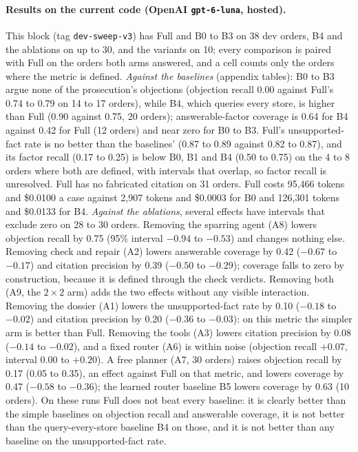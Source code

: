 \paragraph{Results on the current code (OpenAI \texttt{gpt-6-luna}, hosted).}    This block (tag \texttt{dev-sweep-v3}) has Full and B0 to B3 on 38 dev orders, B4 and the ablations on up to 30, and the variants on 10; every comparison is paired with Full on the orders both arms answered, and a cell counts only the orders where the metric is defined. \emph{Against the baselines} (appendix tables): B0 to B3 argue none of the prosecution's objections (objection recall 0.00 against Full's 0.74 to 0.79 on 14 to 17 orders), while B4, which queries every store, is higher than Full (0.90 against 0.75, 20 orders); answerable-factor coverage is 0.64 for B4 against 0.42 for Full (12 orders) and near zero for B0 to B3. Full's unsupported-fact rate is no better than the baselines' (0.87 to 0.89 against 0.82 to 0.87), and its factor recall (0.17 to 0.25) is below B0, B1 and B4 (0.50 to 0.75) on the 4 to 8 orders where both are defined, with intervals that overlap, so factor recall is unresolved. Full has no fabricated citation on 31 orders. Full costs 95,466 tokens and \$0.0100 a case against 2,907 tokens and \$0.0003 for B0 and 126,301 tokens and \$0.0133 for B4. \emph{Against the ablations}, several effects have intervals that exclude zero on 28 to 30 orders. Removing the sparring agent (A8) lowers objection recall by 0.75 (95\% interval $-0.94$ to $-0.53$) and changes nothing else. Removing check and repair (A2) lowers answerable coverage by 0.42 ($-0.67$ to $-0.17$) and citation precision by 0.39 ($-0.50$ to $-0.29$); coverage falls to zero by construction, because it is defined through the check verdicts. Removing both (A9, the $2\times2$ arm) adds the two effects without any visible interaction. Removing the dossier (A1) lowers the unsupported-fact rate by 0.10 ($-0.18$ to $-0.02$) and citation precision by 0.20 ($-0.36$ to $-0.03$): on this metric the simpler arm is better than Full. Removing the tools (A3) lowers citation precision by 0.08 ($-0.14$ to $-0.02$), and a fixed router (A6) is within noise (objection recall $+0.07$, interval $0.00$ to $+0.20$). A free planner (A7, 30 orders) raises objection recall by 0.17 (0.05 to 0.35), an effect against Full on that metric, and lowers coverage by 0.47 ($-0.58$ to $-0.36$); the learned router baseline B5 lowers coverage by 0.63 (10 orders). On these runs Full does not beat every baseline: it is clearly better than the simple baselines on objection recall and answerable coverage, it is not better than the query-every-store baseline B4 on those, and it is not better than any baseline on the unsupported-fact rate.

